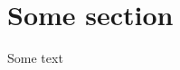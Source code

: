 \documentclass{article}
\begin{document}
\section{Some section}
\label{sec}

Some text

\cite{inbook-full}



\end{document}
